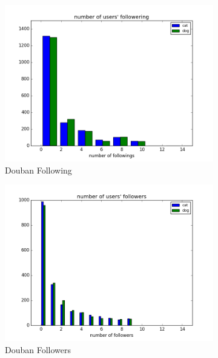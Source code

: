 \documentclass[12pt]{article}
\begin{document}
\begin{figure}[h!]
  \centering
  \begin{subfigure}[b]{0.3\linewidth}
    \includegraphics[width=\linewidth]{../MovieFollowInformation/followings.png}
    \caption{Douban Following}
  \end{subfigure}
  \begin{subfigure}[b]{0.3\linewidth}
    \includegraphics[width=\linewidth]{../MovieFollowInformation/followers.png}
    \caption{Douban Followers}
  \end{subfigure}
  \begin{subfigure}[b]{0.3\linewidth}

\end{subfigure}
\end{figure}
\end{document}
